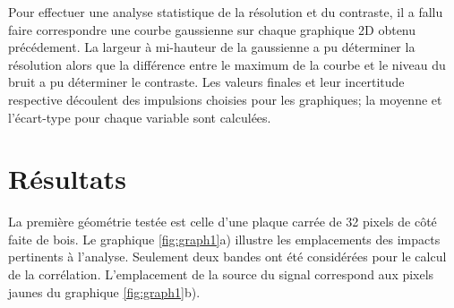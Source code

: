 \documentclass[conference]{IEEEtran}
\begin{document}
Pour effectuer une analyse statistique de la résolution et du contraste, il a fallu 
faire correspondre une courbe gaussienne sur chaque graphique 2D obtenu précédement. 
La largeur à mi-hauteur de la gaussienne a pu déterminer la résolution alors que la 
différence entre le maximum de la courbe et le niveau du bruit a pu déterminer le contraste.
Les valeurs finales et leur incertitude respective découlent des impulsions choisies pour 
les graphiques; la moyenne et l'écart-type pour chaque variable sont calculées.








\section{Résultats}


La première géométrie testée est celle d'une plaque carrée de 32 pixels de côté faite de bois. Le graphique \ref{fig:graph1}a)
illustre les emplacements des impacts pertinents à l'analyse. Seulement deux bandes ont été considérées
pour le calcul de la corrélation. L'emplacement de la source du signal correspond aux pixels jaunes du
graphique \ref{fig:graph1}b).
\end{document}
